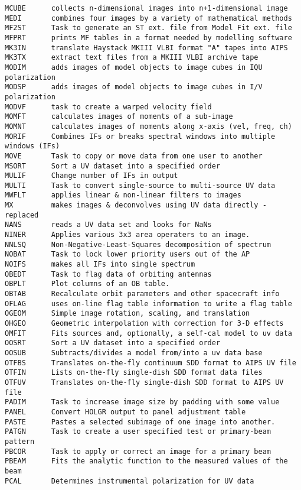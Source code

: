 \begin{verbatim}
MCUBE      collects n-dimensional images into n+1-dimensional image
MEDI       combines four images by a variety of mathematical methods
MF2ST      Task to generate an ST ext. file from Model Fit ext. file
MFPRT      prints MF tables in a format needed by modelling software
MK3IN      translate Haystack MKIII VLBI format "A" tapes into AIPS
MK3TX      extract text files from a MKIII VLBI archive tape
MODIM      adds images of model objects to image cubes in IQU polarization
MODSP      adds images of model objects to image cubes in I/V polarization
MODVF      task to create a warped velocity field
MOMFT      calculates images of moments of a sub-image
MOMNT      calculates images of moments along x-axis (vel, freq, ch)
MORIF      Combines IFs or breaks spectral windows into multiple windows (IFs)
MOVE       Task to copy or move data from one user to another
MSORT      Sort a UV dataset into a specified order
MULIF      Change number of IFs in output
MULTI      Task to convert single-source to multi-source UV data
MWFLT      applies linear & non-linear filters to images
MX         makes images & deconvolves using UV data directly - replaced
NANS       reads a UV data set and looks for NaNs
NINER      Applies various 3x3 area operaters to an image.
NNLSQ      Non-Negative-Least-Squares decomposition of spectrum
NOBAT      Task to lock lower priority users out of the AP
NOIFS      makes all IFs into single spectrum
OBEDT      Task to flag data of orbiting antennas
OBPLT      Plot columns of an OB table.
OBTAB      Recalculate orbit parameters and other spacecraft info
OFLAG      uses on-line flag table information to write a flag table
OGEOM      Simple image rotation, scaling, and translation
OHGEO      Geometric interpolation with correction for 3-D effects
OMFIT      Fits sources and, optionally, a self-cal model to uv data
OOSRT      Sort a UV dataset into a specified order
OOSUB      Subtracts/divides a model from/into a uv data base
OTFBS      Translates on-the-fly continuum SDD format to AIPS UV file
OTFIN      Lists on-the-fly single-dish SDD format data files
OTFUV      Translates on-the-fly single-dish SDD format to AIPS UV file
PADIM      Task to increase image size by padding with some value
PANEL      Convert HOLGR output to panel adjustment table
PASTE      Pastes a selected subimage of one image into another.
PATGN      Task to create a user specified test or primary-beam pattern
PBCOR      Task to apply or correct an image for a primary beam
PBEAM      Fits the analytic function to the measured values of the beam
PCAL       Determines instrumental polarization for UV data

\end{verbatim}

